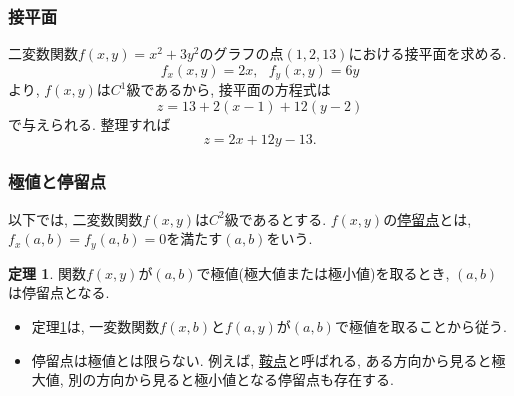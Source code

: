 \documentclass[dvipdfmx,cjk,10.2pt]{beamer}
\theoremstyle{definition}
\newtheorem{Thm}{定理}[section]
\begin{document}


\begin{frame}
\frametitle{接平面}

二変数関数$f(x,y)=x^2+3y^2$のグラフの点$(1,2,13)$における接平面を求める. 
$$
f_x(x,y)=2x, \ \ \ f_y(x,y)=6y
$$
より, $f(x,y)$は$C^1$級であるから, 接平面の方程式は
$$
z=13+2(x-1)+12(y-2)
$$
で与えられる. 整理すれば
$$
z=2x+12y-13. 
$$

\end{frame}




\begin{frame}
\frametitle{極値と停留点}

以下では, 二変数関数$f(x,y)$は$C^2$級であるとする. 
$f(x,y)$の\underline{停留点}とは, $f_x(a,b) = f_y(a,b) = 0$を満たす$(a,b)$をいう. 

\begin{Thm} \label{極値->停留点}
関数$f(x,y)$が$(a,b)$で極値(極大値または極小値)を取るとき, $(a,b)$は停留点となる. 
\end{Thm}

\begin{itemize}
\item 定理\ref{極値->停留点}は, 一変数関数$f(x,b)$と$f(a,y)$が$(a,b)$で極値を取ることから従う. 
\item 停留点は極値とは限らない. 例えば, \underline{鞍点}と呼ばれる, ある方向から見ると極大値, 別の方向から見ると極小値となる停留点も存在する. 
\end{itemize}

\end{frame}




\end{document}

